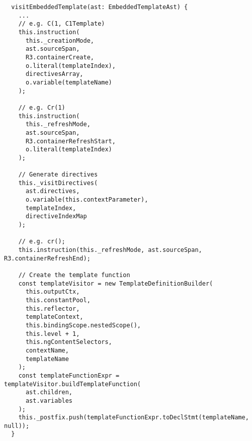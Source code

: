 \begin{verbatim}
  visitEmbeddedTemplate(ast: EmbeddedTemplateAst) {
    ...
    // e.g. C(1, C1Template)
    this.instruction(
      this._creationMode,
      ast.sourceSpan,
      R3.containerCreate,
      o.literal(templateIndex),
      directivesArray,
      o.variable(templateName)
    );

    // e.g. Cr(1)
    this.instruction(
      this._refreshMode,
      ast.sourceSpan,
      R3.containerRefreshStart,
      o.literal(templateIndex)
    );

    // Generate directives
    this._visitDirectives(
      ast.directives,
      o.variable(this.contextParameter),
      templateIndex,
      directiveIndexMap
    );

    // e.g. cr();
    this.instruction(this._refreshMode, ast.sourceSpan, R3.containerRefreshEnd);

    // Create the template function
    const templateVisitor = new TemplateDefinitionBuilder(
      this.outputCtx,
      this.constantPool,
      this.reflector,
      templateContext,
      this.bindingScope.nestedScope(),
      this.level + 1,
      this.ngContentSelectors,
      contextName,
      templateName
    );
    const templateFunctionExpr = templateVisitor.buildTemplateFunction(
      ast.children,
      ast.variables
    );
    this._postfix.push(templateFunctionExpr.toDeclStmt(templateName, null));
  }
\end{verbatim}
